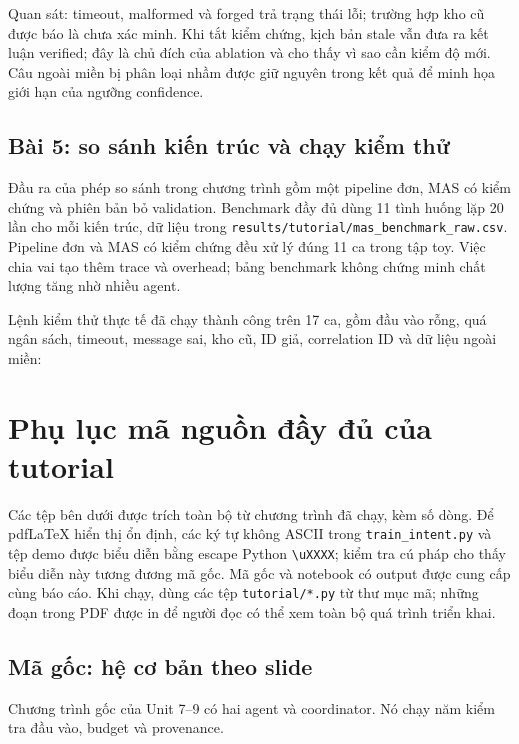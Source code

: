 Quan sát: timeout, malformed và forged trả trạng thái lỗi; trường hợp kho cũ được báo là chưa xác minh. Khi tắt kiểm chứng, kịch bản stale vẫn đưa ra kết luận verified; đây là chủ đích của ablation và cho thấy vì sao cần kiểm độ mới. Câu ngoài miền bị phân loại nhầm được giữ nguyên trong kết quả để minh họa giới hạn của ngưỡng confidence.

\subsection{Bài 5: so sánh kiến trúc và chạy kiểm thử}
Đầu ra của phép so sánh trong chương trình gồm một pipeline đơn, MAS có kiểm chứng và phiên bản bỏ validation. Benchmark đầy đủ dùng 11 tình huống lặp 20 lần cho mỗi kiến trúc, dữ liệu trong \texttt{results/tutorial/mas\_benchmark\_raw.csv}. Pipeline đơn và MAS có kiểm chứng đều xử lý đúng 11 ca trong tập toy. Việc chia vai tạo thêm trace và overhead; bảng benchmark không chứng minh chất lượng tăng nhờ nhiều agent.

Lệnh kiểm thử thực tế đã chạy thành công trên 17 ca, gồm đầu vào rỗng, quá ngân sách, timeout, message sai, kho cũ, ID giả, correlation ID và dữ liệu ngoài miền:


\section{Phụ lục mã nguồn đầy đủ của tutorial}

Các tệp bên dưới được trích toàn bộ từ chương trình đã chạy, kèm số dòng. Để pdfLaTeX hiển thị ổn định, các ký tự không ASCII trong \texttt{train\_intent.py} và tệp demo được biểu diễn bằng escape Python \texttt{\textbackslash uXXXX}; kiểm tra cú pháp cho thấy biểu diễn này tương đương mã gốc. Mã gốc và notebook có output được cung cấp cùng báo cáo. Khi chạy, dùng các tệp \texttt{tutorial/*.py} từ thư mục mã; những đoạn trong PDF được in để người đọc có thể xem toàn bộ quá trình triển khai.

\subsection{Mã gốc: hệ cơ bản theo slide}
Chương trình gốc của Unit 7--9 có hai agent và coordinator. Nó chạy năm kiểm tra đầu vào, budget và provenance.



